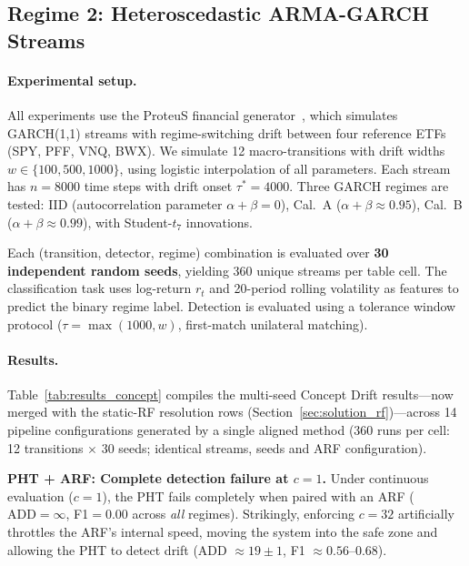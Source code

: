 \documentclass[10pt,conference]{IEEEtran}
\theoremstyle{definition}
\begin{document}
\subsection{Regime 2: Heteroscedastic ARMA-GARCH Streams}\label{sec:proteus}

\paragraph{Experimental setup.}
All experiments use the ProteuS financial generator~\cite{suarez_cetrulo_proteus_2025}, which simulates GARCH(1,1) streams with regime-switching drift between four reference ETFs (SPY, PFF, VNQ, BWX).
We simulate 12 macro-transitions with drift widths $w \in \{100, 500, 1000\}$, using logistic interpolation of all parameters.
Each stream has $n = 8000$ time steps with drift onset $\tau^* = 4000$.
Three GARCH regimes are tested: IID (autocorrelation parameter $\alpha + \beta = 0$), Cal.~A ($\alpha + \beta \approx 0.95$), Cal.~B ($\alpha + \beta \approx 0.99$), with Student-$t_7$ innovations.

Each (transition, detector, regime) combination is evaluated over \textbf{30 independent random seeds}, yielding 360 unique streams per table cell.
The classification task uses log-return $r_t$ and 20-period rolling volatility as features to predict the binary regime label.
Detection is evaluated using a tolerance window protocol ($\tau = \max(1000, w)$, first-match unilateral matching).

\paragraph{Results.}
Table~\ref{tab:results_concept} compiles the multi-seed Concept Drift results---now merged with the static-RF resolution rows (Section~\ref{sec:solution_rf})---across 14 pipeline configurations generated by a single aligned method (360 runs per cell: 12 transitions $\times$ 30 seeds; identical streams, seeds and ARF configuration).



\textbf{PHT + ARF: Complete detection failure at $c{=}1$.}
Under continuous evaluation ($c{=}1$), the PHT fails completely when paired with an ARF ($\mathrm{ADD}{=}\infty$, F1${=}0.00$ across \emph{all} regimes).
Strikingly, enforcing $c{=}32$ artificially throttles the ARF's internal speed, moving the system into the safe zone and allowing the PHT to detect drift (ADD ${\approx}19{\pm}1$, F1 ${\approx}0.56$--$0.68$).
\end{document}
